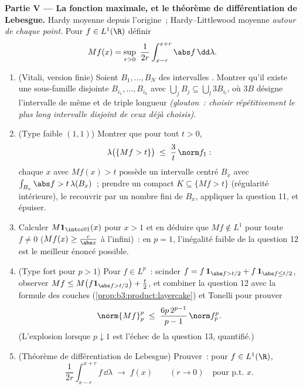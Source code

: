 \begin{problem}
\medskip
\noindent\textbf{Partie V --- La fonction maximale, et le
théorème de différentiation de Lebesgue.} Hardy moyenne
depuis l'origine~; Hardy--Littlewood moyenne \emph{autour
de chaque point}. Pour $f \in L^1(\R)$ définir
\[
Mf(x) = \sup_{r>0}\ \frac1{2r}\int_{x-r}^{x+r}\abs
f\,\dd\lambda .
\]
\begin{enumerate}[resume]
  \item (Vitali, version finie) Soient $B_1, \dots, B_N$ des
        intervalles . Montrer qu'il existe une
        sous-famille disjointe $B_{i_1}, \dots, B_{i_k}$
        avec $\bigcup_jB_j \subseteq \bigcup_l3B_{i_l}$,
        où $3B$ désigne l'intervalle de même  et de
        triple longueur \emph{(glouton~: choisir
        répétitivement le plus long intervalle disjoint de
        ceux déjà choisis)}.
  \item (Type faible $(1,1)$) Montrer que pour tout $t >
        0$,
        \[
        \lambda\bigl(\{Mf > t\}\bigr) \;\leq\;
        \frac3t\,\norm f_1 :
        \]
        chaque $x$ avec $Mf(x) > t$ possède un intervalle
        centré $B_x$ avec $\int_{B_x}\abs f >
        t\,\lambda(B_x)$~; prendre un compact $K \subseteq
        \{Mf > t\}$ (régularité intérieure), le recouvrir
        par un nombre fini de $B_x$, appliquer la question
        11, et épuiser.
  \item Calculer $M\mathbf 1_{\intcc01}(x)$ pour $x > 1$ et
        en déduire que $Mf \notin L^1$ pour toute $f \neq 0$
        ($Mf(x) \geq \frac c{\abs x}$ à l'infini)~: en $p =
        1$, l'inégalité faible de la question 12 est le
        meilleur énoncé possible.
  \item (Type fort pour $p > 1$) Pour $f \in L^p$~: scinder
        $f = f\,\mathbf 1_{\abs f > t/2} + f\,\mathbf
        1_{\abs f \leq t/2}$, observer $Mf \leq
        M\bigl(f\mathbf 1_{\abs f > t/2}\bigr) + \frac
        t2$, et combiner la question 12 avec la formule des
        couches (\cref{prop:b3:product:layercake}) et
        Tonelli pour prouver
        \[
        \norm{Mf}_p^p \;\leq\;
        \frac{6p\,2^{p-1}}{p-1}\,\norm f_p^p .
        \]
        (L'explosion lorsque $p \downarrow 1$ est l'échec de
        la question 13, quantifié.)
  \item (Théorème de différentiation de Lebesgue) Prouver~:
        pour $f \in L^1(\R)$,
        \[
        \frac1{2r}\int_{x-r}^{x+r}f\,\dd\lambda
        \;\longrightarrow\; f(x)
        \qquad (r \to 0)\quad\text{pour p.t.\ }x .
        \]

\end{enumerate}
\end{problem}
